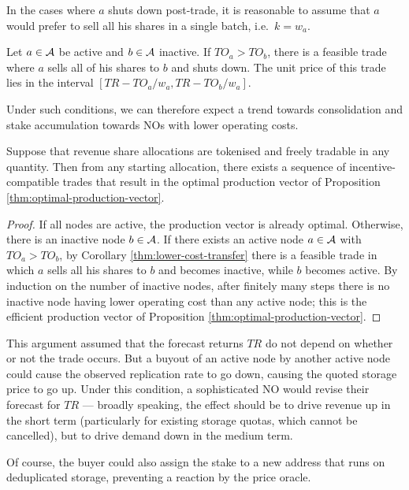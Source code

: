 In the cases where $a$ shuts down post-trade, it is reasonable to assume that $a$ would prefer to sell all his shares in a single batch, i.e.~$k=w_a$.

\begin{corollary}\label{thm:lower-cost-transfer}

  Let $a\in\mathcal{A}$ be active and $b\in\mathcal{A}$ inactive.
  If $TO_a>TO_b$, there is a feasible trade where $a$ sells all of his shares to $b$ and shuts down.
  The unit price of this trade lies in the interval $[TR-TO_a/w_a,TR-TO_b/w_a]$.

\end{corollary}

Under such conditions, we can therefore expect a trend towards consolidation and stake accumulation towards NOs with lower operating costs.

\begin{corollary}\label{thm:efficient-reallocation-is-possible}

  Suppose that revenue share allocations are tokenised and freely tradable in any quantity.
  Then from any starting allocation, there exists a sequence of incentive-compatible trades that result in the optimal production vector of Proposition \ref{thm:optimal-production-vector}.

\end{corollary}
%
\begin{proof}

  If all nodes are active, the production vector is already optimal.
  Otherwise, there is an inactive node $b\in\mathcal{A}$.
  If there exists an active node $a\in\mathcal{A}$ with $TO_a>TO_b$, by Corollary \ref{thm:lower-cost-transfer} there is a feasible trade in which $a$ sells all his shares to $b$ and becomes inactive, while $b$ becomes active.
  By induction on the number of inactive nodes, after finitely many steps there is no inactive node having lower operating cost than any active node; this is the efficient production vector of Proposition \ref{thm:optimal-production-vector}. \qedhere

\end{proof}

\begin{remark}

  This argument assumed that the forecast returns $TR$ do not depend on whether or not the trade occurs. 
  But a buyout of an active node by another active node could cause the observed replication rate to go down, causing the quoted storage price to go up. 
  Under this condition, a sophisticated NO would revise their forecast for $TR$ --- broadly speaking, the effect should be to drive revenue up in the short term (particularly for existing storage quotas, which cannot be cancelled), but to drive demand down in the medium term.
  
  Of course, the buyer could also assign the stake to a new address that runs on deduplicated storage, preventing a reaction by the price oracle.

\end{remark}



